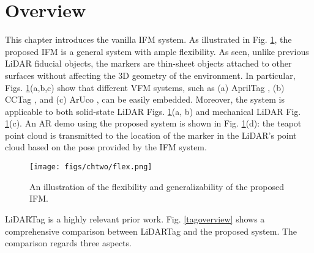 \section{Overview} \label{3.1}
This chapter introduces the vanilla IFM system. As illustrated in Fig. \ref{flex}, the proposed IFM is a general system with ample flexibility. As seen, unlike previous LiDAR fiducial objects, the markers are thin-sheet objects attached to other surfaces without affecting the 3D geometry of the environment. In particular, Figs. \ref{flex}(a,b,c) show that different VFM systems, such as (a) AprilTag \cite{ap3}, (b) CCTag \cite{cctag}, and (c) ArUco \cite{aruco}, can be easily embedded. Moreover, the system is applicable to both solid-state LiDAR Figs. \ref{flex}(a, b) and mechanical LiDAR Fig. \ref{flex}(c). An AR demo using the proposed system is shown in Fig. \ref{flex}(d): the teapot point cloud is transmitted to the location of the marker in the LiDAR's point cloud based on the pose provided by the IFM system. \par
\begin{figure}[H] 
	\centering
	\texttt{[image: figs/chtwo/flex.png]}
	\caption{An illustration of the flexibility and generalizability of the proposed IFM.
 }
	\label{flex}
\end{figure}
LiDARTag \cite{lt} is a highly relevant prior work. Fig. \ref{tagoverview} shows a comprehensive comparison between LiDARTag and the proposed system. The comparison regards three aspects. 
